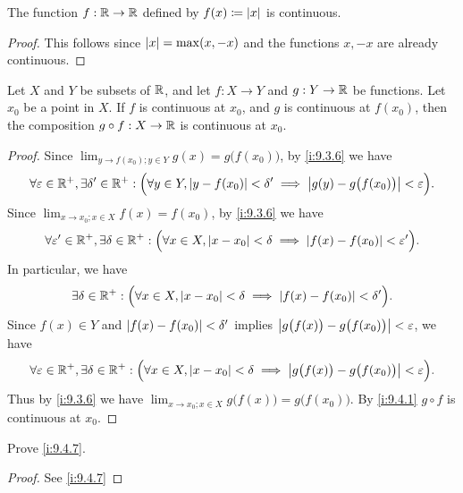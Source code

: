 \begin{prop}\label{i:9.4.12}
  The function \(f : \mathbb{R} \to \mathbb{R}\) defined by \(f(x) \coloneqq \left\lvert x\right\rvert\) is continuous.
\end{prop}

\begin{proof}
  This follows since \(\left\lvert x\right\rvert = \max(x, -x)\) and the functions \(x, -x\) are already continuous.
\end{proof}

\begin{prop}\label{i:9.4.13}
  Let \(X\) and \(Y\) be subsets of \(\mathbb{R}\), and let \(f : X \to Y\) and \(g : Y \to \mathbb{R}\) be functions.
  Let \(x_0\) be a point in \(X\).
  If \(f\) is continuous at \(x_0\), and \(g\) is continuous at \(f(x_0)\), then the composition \(g \circ f : X \to \mathbb{R}\) is continuous at \(x_0\).
\end{prop}

\begin{proof}
  Since \(\lim_{y \to f(x_0) ; y \in Y} g(x) = g\big(f(x_0)\big)\), by \cref{i:9.3.6} we have
  \[
    \forall \varepsilon \in \mathbb{R}^+, \exists \delta' \in \mathbb{R}^+ : \Big(\forall y \in Y, \left\lvert y - f(x_0)\right\rvert < \delta' \implies \left\lvert g(y) - g\big(f(x_0)\big)\right\rvert < \varepsilon\Big).
  \]
  Since \(\lim_{x \to x_0 ; x \in X} f(x) = f(x_0)\), by \cref{i:9.3.6} we have
  \[
    \forall \varepsilon' \in \mathbb{R}^+, \exists \delta \in \mathbb{R}^+ : \Big(\forall x \in X, \left\lvert x - x_0\right\rvert < \delta \implies \left\lvert f(x) - f(x_0)\right\rvert < \varepsilon'\Big).
  \]
  In particular, we have
  \[
    \exists \delta \in \mathbb{R}^+ : \Big(\forall x \in X, \left\lvert x - x_0\right\rvert < \delta \implies \left\lvert f(x) - f(x_0)\right\rvert < \delta'\Big).
  \]
  Since \(f(x) \in Y\) and \(\left\lvert f(x) - f(x_0)\right\rvert < \delta'\) implies \(\left\lvert g\big(f(x)\big) - g\big(f(x_0)\big)\right\rvert < \varepsilon\), we have
  \[
    \forall \varepsilon \in \mathbb{R}^+, \exists \delta \in \mathbb{R}^+ : \Big(\forall x \in X, \left\lvert x - x_0\right\rvert < \delta \implies \left\lvert g\big(f(x)\big) - g\big(f(x_0)\big)\right\rvert < \varepsilon\Big).
  \]
  Thus by \cref{i:9.3.6} we have \(\lim_{x \to x_0 ; x \in X} g\big(f(x)\big) = g\big(f(x_0)\big)\).
  By \cref{i:9.4.1} \(g \circ f\) is continuous at \(x_0\).
\end{proof}

\exercisesection

\begin{ex}\label{i:ex:9.4.1}
  Prove \cref{i:9.4.7}.
\end{ex}

\begin{proof}
  See \cref{i:9.4.7}
\end{proof}

